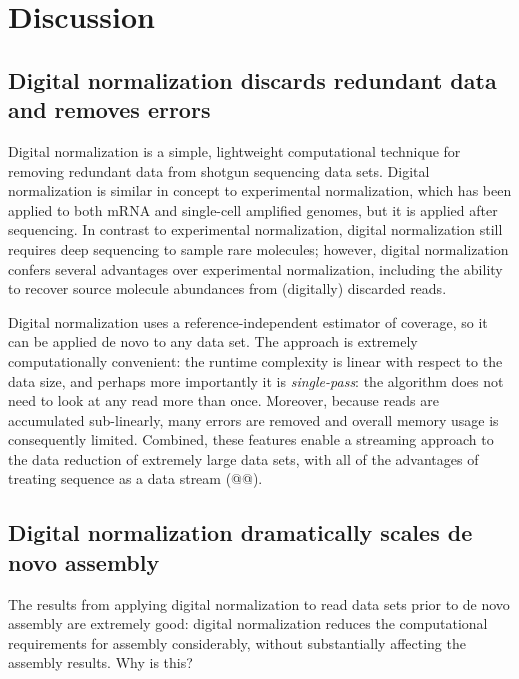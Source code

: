 \documentclass[10pt]{article}
\begin{document}

\section*{Discussion}


\subsection*{Digital normalization discards redundant data and removes errors}

Digital normalization is a simple, lightweight computational technique
for removing redundant data from shotgun sequencing data sets.
Digital normalization is similar in concept to experimental
normalization, which has been applied to both mRNA and single-cell
amplified genomes, but it is applied after sequencing.  In contrast to
experimental normalization, digital normalization still requires deep
sequencing to sample rare molecules; however, digital normalization
confers several advantages over experimental normalization, including
the ability to recover source molecule abundances from
(digitally) discarded reads.

Digital normalization uses a reference-independent estimator of
coverage, so it can be applied de novo to any data set.  The approach
is extremely computationally convenient: the runtime complexity is
linear with respect to the data size, and perhaps more importantly it
is {\em single-pass}: the algorithm does not need to look
at any read more than once.  Moreover, because reads are accumulated
sub-linearly, many errors are removed and overall memory usage is
consequently limited.  Combined, these features enable a streaming
approach to the data reduction of extremely large data sets, with all
of the advantages of treating sequence as a data stream (@@).

\subsection*{Digital normalization dramatically scales de novo assembly}

The results from applying digital normalization to read data sets
prior to de novo assembly are extremely good: digital normalization
reduces the computational requirements for assembly considerably,
without substantially affecting the assembly results.  Why is this?
\end{document}
